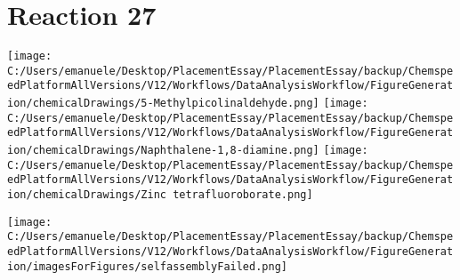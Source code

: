 \documentclass{article}%
\begin{document}
\section*{Reaction 27}%
%
\begin{scheme}[H]%
\begin{minipage}{0.5\textwidth}%
\texttt{[image: C:/Users/emanuele/Desktop/PlacementEssay/PlacementEssay/backup/ChemspeedPlatformAllVersions/V12/Workflows/DataAnalysisWorkflow/FigureGeneration/chemicalDrawings/5-Methylpicolinaldehyde.png]}%
\texttt{[image: C:/Users/emanuele/Desktop/PlacementEssay/PlacementEssay/backup/ChemspeedPlatformAllVersions/V12/Workflows/DataAnalysisWorkflow/FigureGeneration/chemicalDrawings/Naphthalene-1,8-diamine.png]}%
\texttt{[image: C:/Users/emanuele/Desktop/PlacementEssay/PlacementEssay/backup/ChemspeedPlatformAllVersions/V12/Workflows/DataAnalysisWorkflow/FigureGeneration/chemicalDrawings/Zinc tetrafluoroborate.png]}%
\end{minipage}%
\begin{minipage}{0.5\textwidth}%
\begin{center}%
\texttt{[image: C:/Users/emanuele/Desktop/PlacementEssay/PlacementEssay/backup/ChemspeedPlatformAllVersions/V12/Workflows/DataAnalysisWorkflow/FigureGeneration/imagesForFigures/selfassemblyFailed.png]}%
\end{center}%
\end{minipage}%
\caption{Self-assembly of components 3, 21, with Zinc(II) in a 3.0:1.5:1.0 molar ratio in CH$_3$CN at 60\textdegree C for 40h. These are the reagents (starting materials) for reaction 27.}%
\end{scheme}%
\end{document}
